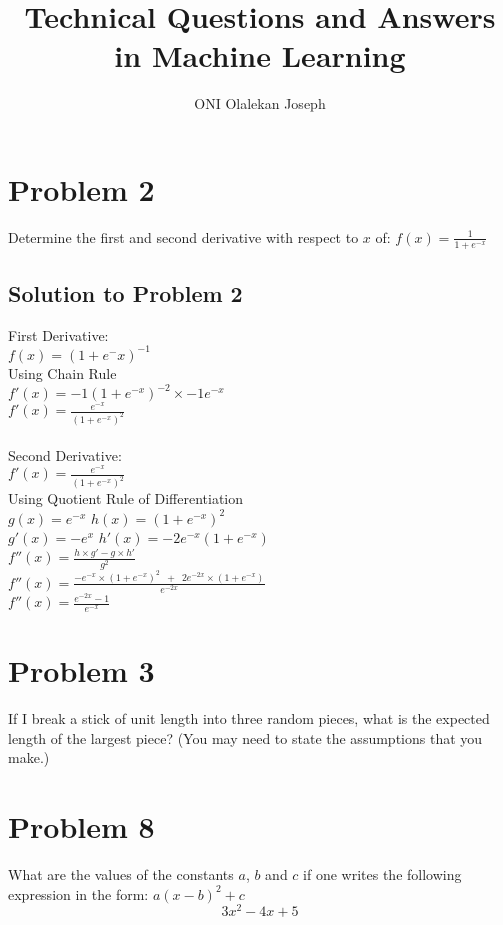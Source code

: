 \documentclass{article}
\begin{document}
\title{Technical Questions and Answers in Machine Learning}
\author{ONI Olalekan Joseph}

\maketitle

\section{Problem 2}
Determine the first and second derivative with respect to $x$ of: $f(x)= \frac{1}{1 + e^{-x}} $

\subsection{Solution to Problem 2}
 First Derivative: \\
 $f(x) = (1 + e^-x)^{-1}$ \\
 Using Chain Rule \\
 $f'(x) = -1(1 + e^{-x})^{-2} \times -1e^{-x}$ \\
 $f'(x) = \frac{e^{-x}}{(1 + e^{-x})^{2}}$ \\ \\
 
\noindent Second Derivative:  \\
 $f'(x) = \frac{e^{-x}}{(1 + e^{-x})^{2}}$ \\
 Using Quotient Rule of Differentiation \\
 $g(x) = e^{-x}$  \qquad  $h(x) = (1 + e^{-x})^{2}$ \\
 $ g'(x) = -e^{x} $ \qquad $h'(x) = -2e^{-x}(1 + e^{-x}) $ \\
 $f''(x) = \frac{h \times g' - g \times h' }{g^2}  $ \\
 $f''(x) = \frac{-e^{-x} \times (1 + e^{-x})^{2} \enspace + \enspace 2e^{-2x} \times (1 + e^{-x})}{e^{-2x}} $\\
 $f''(x) = \frac{e^{-2x} - 1}{e^{-x}} $
 
\section{Problem 3}
 If I break a stick of unit length into three random pieces, what is the expected length of the largest piece? (You may need to state the assumptions that you make.)

\section{Problem 8}
What are the values of the constants $a$, $b$ and $c$ if one writes the following expression in the form: $ a(x - b)^{2} + c$ \\
 \begin{equation}\label{key}
 3x^{2} - 4x + 5
 \end{equation}
 
\end{document}
